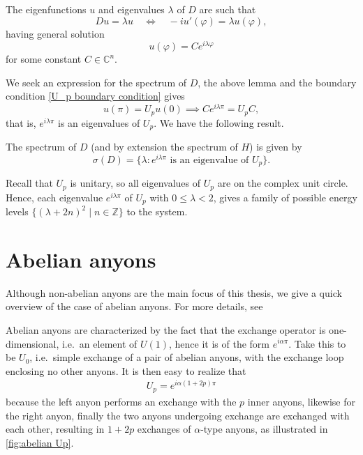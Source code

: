 \begin{lemma}
  The eigenfunctions $u$ and eigenvalues $λ$ of $D$ are such that
  \begin{equation}
    D u = λ u \quad \iff \quad -iu'(\varphi) = λ u(\varphi),
  \end{equation}
  having general solution
  \begin{equation}
    u(\varphi) = C e^{iλ\varphi}
  \end{equation}
  for some constant $C ∈ \mathbb{C}^n$.
\end{lemma}

We seek an expression for the spectrum of $D$, the above lemma and the boundary condition \cref{U_p boundary condition} gives
\begin{equation}
  u(π) = U_p u(0) \implies
  C e^{iλπ} = U_p C,
\end{equation}
that is, $e^{iλπ}$ is an eigenvalues of $U_p$. We have the following result.

\begin{lemma}\label{D spectrum}
  The spectrum of $D$ (and by extension the spectrum of $H$) is given by
  \begin{equation}
    σ(D) = \big\{λ : e^{iλπ} \text{ is an eigenvalue of } U_p\big\}.
  \end{equation}
\end{lemma}

\begin{remark}
  Recall that $U_p$ is unitary, so all eigenvalues of $U_p$ are on the complex unit circle. Hence, each eigenvalue $e^{iλπ}$ of $U_p$ with $0 \le λ < 2$, gives a family of possible energy levels $\big\{(λ + 2n)^2 \mid n ∈ ℤ\big\}$ to the system.
\end{remark}





\section{Abelian anyons}\label{sec:statistical repulsion abelian ayons}

Although non-abelian anyons are the main focus of this thesis, we give a quick overview of the case of abelian anyons. For more details, see \cite{lundholm-solovej}

Abelian anyons are characterized by the fact that the exchange operator is one-dimensional, i.e.\ an element of $U(1)$, hence it is of the form $e^{iα\pi}$. Take this to be $U_0$, i.e.\ simple exchange of a pair of abelian anyons, with the exchange loop enclosing no other anyons. It is then easy to realize that
\begin{align}\label{eq:abelian Up}
  U_p = e^{iα(1+2p)π}
\end{align}
because the left anyon performs an exchange with the $p$ inner anyons, likewise for the right anyon, finally the two anyons undergoing exchange are exchanged with each other, resulting in $1+2p$ exchanges of $α$-type anyons, as illustrated in \cref{fig:abelian Up}.

